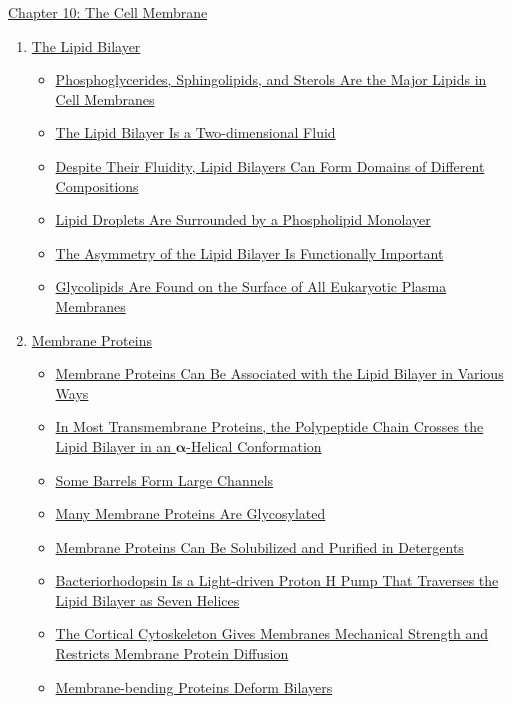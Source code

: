 \documentclass[12pt,letterpaper]{article}
\begin{document}

\begin{chapbox}{\hyperlink{home}{Chapter 10: The Cell Membrane}}
    \begin{enumerate}
        \item \hyperlink{10.1a}{The Lipid Bilayer}
        \begin{itemize}
            \item \hyperlink{10.1}{ Phosphoglycerides, Sphingolipids, and Sterols Are the Major Lipids in Cell Membranes}
            \item \hyperlink{10.2}{ The Lipid Bilayer Is a Two-dimensional Fluid}
            \item \hyperlink{10.3}{ Despite Their Fluidity, Lipid Bilayers Can Form Domains of Different Compositions}
            \item \hyperlink{10.4}{ Lipid Droplets Are Surrounded by a Phospholipid Monolayer}
            \item \hyperlink{10.5}{ The Asymmetry of the Lipid Bilayer Is Functionally Important}
            \item \hyperlink{10.6}{ Glycolipids Are Found on the Surface of All Eukaryotic Plasma Membranes}
        \end{itemize}
        \item \hyperlink{10.2a}{Membrane Proteins}
        \begin{itemize}
            \item \hyperlink{10.7}{ Membrane Proteins Can Be Associated with the Lipid Bilayer in Various Ways}
            \item \hyperlink{10.8}{ In Most Transmembrane Proteins, the Polypeptide Chain Crosses the Lipid Bilayer in an \(\bm{\alpha}\)-Helical Conformation}
            \item \hyperlink{10.9}{ Some \bfg{\beta} Barrels Form Large Channels}
            \item \hyperlink{10.10}{ Many Membrane Proteins Are Glycosylated}
            \item \hyperlink{10.11}{ Membrane Proteins Can Be Solubilized and Purified in Detergents}
            \item \hyperlink{10.12}{ Bacteriorhodopsin Is a Light-driven Proton H\bfg{^+} Pump That Traverses the Lipid Bilayer as Seven \bfg{\alpha} Helices}
            \item \hyperlink{10.1}{ The Cortical Cytoskeleton Gives Membranes Mechanical Strength and Restricts Membrane Protein Diffusion}
            \item \hyperlink{10.1}{ Membrane-bending Proteins Deform Bilayers}
        \end{itemize}
    \end{enumerate}
\end{chapbox}
\end{document}

